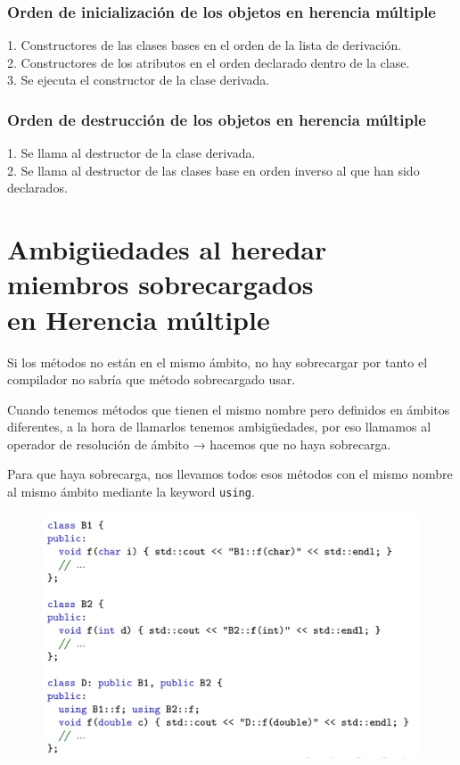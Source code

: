 \begin{minipage}[t]{0.45\textwidth}
\subsubsection{Orden de inicialización de los objetos en herencia múltiple}
1. Constructores de las clases bases en el orden de la lista de derivación.\\

2. Constructores de los atributos en el orden declarado dentro de la clase.\\

3. Se ejecuta el constructor de la clase derivada.

\end{minipage}
\hfill
\begin{minipage}[t]{0.45\textwidth}
\subsubsection{Orden de destrucción de los objetos en herencia múltiple}
1. Se llama al destructor de la clase derivada.\\

2. Se llama al destructor de las clases base en orden inverso al que han sido declarados.
\end{minipage}
\newpage
\section{Ambigüedades al heredar miembros sobrecargados\\ en Herencia múltiple}
Si los métodos no están en el mismo ámbito, no hay sobrecargar por tanto el compilador no sabría que método sobrecargado usar.

Cuando tenemos métodos que tienen el mismo nombre pero definidos en ámbitos diferentes, a la hora de llamarlos tenemos ambigüedades, por eso llamamos al operador de resolución de ámbito → hacemos que no haya sobrecarga.

Para que haya sobrecarga, nos llevamos todos esos métodos con el mismo nombre al mismo ámbito mediante la keyword \texttt{using}.
\begin{center}
\begin{figure}[h]
	\includegraphics[width=\textwidth]{Imagenes/gen8.png}
\end{figure}
\end{center}

